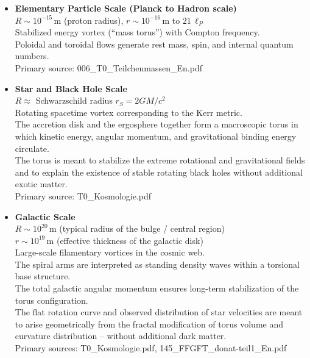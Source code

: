 \begin{itemize}
	\item \textbf{Elementary Particle Scale (Planck to Hadron scale)} \\
	$R \sim 10^{-15}\,\text{m}$ (proton radius), $r \sim 10^{-16}\,\text{m}$ to $21\,\ell_P$ \\
	Stabilized energy vortex (``mass torus'') with Compton frequency. \\
	Poloidal and toroidal flows generate rest mass, spin, and internal quantum numbers. \\
	Primary source: 006\_T0\_Teilchenmassen\_En.pdf
	
	\item \textbf{Star and Black Hole Scale} \\
	$R \approx$ Schwarzschild radius $r_S = 2GM/c^2$ \\
	Rotating spacetime vortex corresponding to the Kerr metric. \\
	The accretion disk and the ergosphere together form a macroscopic torus in which kinetic energy, angular momentum, and gravitational binding energy circulate. \\
	The torus is meant to stabilize the extreme rotational and gravitational fields and to explain the existence of stable rotating black holes without additional exotic matter. \\
	Primary source: T0\_Kosmologie.pdf
	
	\item \textbf{Galactic Scale} \\
	$R \sim 10^{20}\,\text{m}$ (typical radius of the bulge / central region) \\
	$r \sim 10^{19}\,\text{m}$ (effective thickness of the galactic disk) \\
	Large-scale filamentary vortices in the cosmic web. \\
	The spiral arms are interpreted as standing density waves within a torsional base structure. \\
	The total galactic angular momentum ensures long-term stabilization of the torus configuration. \\
	The flat rotation curve and observed distribution of star velocities are meant to arise geometrically from the fractal modification of torus volume and curvature distribution – without additional dark matter. \\
	Primary sources: T0\_Kosmologie.pdf, 145\_FFGFT\_donat-teil1\_En.pdf
	

\end{itemize}
